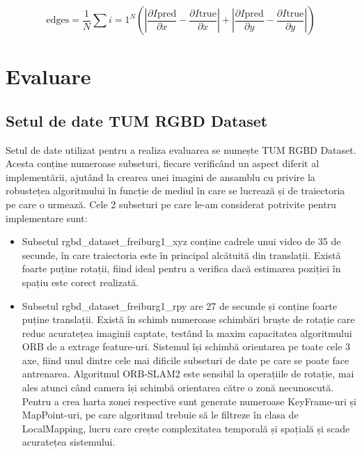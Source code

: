 \documentclass[12pt,a4paper]{report}
\begin{document}
\begin{equation}
{\text{edges}} = \frac{1}{N} \sum{i=1}^{N} \left(
\left| \frac{\partial I{\text{pred}}}{\partial x} - \frac{\partial I{\text{true}}}{\partial x} \right| +
\left| \frac{\partial I{\text{pred}}}{\partial y} - \frac{\partial I{\text{true}}}{\partial y} \right|
\right)
\end{equation}

\chapter{Evaluare}
\section{Setul de date TUM RGBD Dataset}
Setul de date utilizat pentru a realiza evaluarea se numește TUM RGBD Dataset\cite{tum}.
Acesta conține numeroase subseturi, fiecare verificând un aspect diferit al implementării,
ajutând la crearea unei imagini de ansamblu cu privire la robustețea algoritmului în funcție
de mediul în care se lucrează și de traiectoria pe care o urmează. Cele 2 subseturi pe
care le-am considerat potrivite pentru implementare sunt:

\begin{itemize}
\item Subsetul rgbd\_dataset\_freiburg1\_xyz conține cadrele unui video de 35 de secunde, în care
traiectoria este în principal alcătuită din translații. Există foarte puține rotații, fiind
ideal pentru a verifica dacă estimarea poziției în spațiu este corect realizată.

\item Subsetul rgbd\_dataset\_freiburg1\_rpy are 27 de secunde și conține
foarte puține translații. Există în schimb numeroase schimbări bruște de rotație care reduc
acuratețea imaginii captate, testând la maxim capacitatea algoritmului ORB de a extrage
feature-uri. Sistemul își schimbă orientarea pe toate cele 3 axe, fiind unul dintre cele
mai dificile subseturi de date pe care se poate face antrenarea. Algoritmul
ORB-SLAM2 este sensibil la operațiile de rotație, mai ales atunci când camera își schimbă
orientarea către o zonă necunoscută. Pentru a crea harta zonei respective sunt generate
numeroase KeyFrame-uri și MapPoint-uri, pe care algoritmul trebuie să le filtreze în clasa
de LocalMapping, lucru care crește complexitatea temporală și spațială și scade acuratețea
sistemului.
\end{itemize} 
\end{document}
